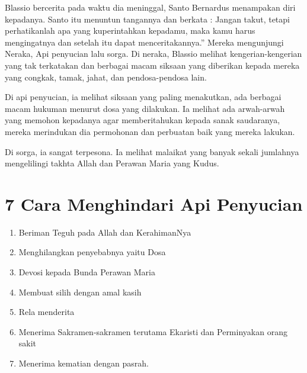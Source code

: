      Blassio bercerita pada waktu dia meninggal, Santo Bernardus menampakan diri kepadanya. Santo itu menuntun tangannya dan berkata : Jangan takut, tetapi perhatikanlah apa yang kuperintahkan kepadamu, maka kamu harus mengingatnya dan setelah itu dapat menceritakannya.” Mereka mengunjungi Neraka, Api penyucian lalu sorga. Di neraka, Blassio melihat kengerian-kengerian yang tak terkatakan dan berbagai macam siksaan yang diberikan kepada mereka yang congkak, tamak, jahat, dan pendosa-pendosa lain.

     Di api penyucian, ia melihat siksaan yang paling menakutkan, ada berbagai macam hukuman menurut dosa yang dilakukan. Ia melihat ada arwah-arwah yang memohon kepadanya agar memberitahukan kepada sanak saudaranya, mereka merindukan dia permohonan dan perbuatan baik yang mereka lakukan.

     Di sorga, ia sangat terpesona. Ia melihat malaikat yang banyak sekali jumlahnya mengelilingi takhta Allah dan Perawan Maria yang Kudus.

\section*{7 Cara Menghindari Api Penyucian}
\begin{enumerate}
\item         Beriman Teguh pada Allah dan KerahimanNya
\item         Menghilangkan penyebabnya yaitu Dosa
\item         Devosi kepada Bunda Perawan Maria
\item         Membuat silih dengan amal kasih
\item         Rela menderita
\item         Menerima Sakramen-sakramen terutama Ekaristi dan Perminyakan orang sakit
\item         Menerima kematian dengan pasrah.
\end{enumerate}

